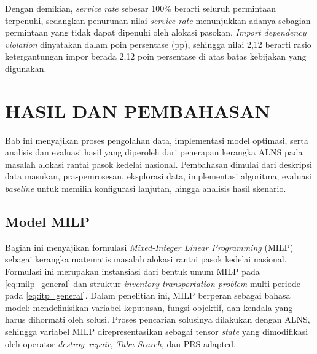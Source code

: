 \documentclass{file/TA-ITS}
\theoremstyle{definition}
\theoremstyle{definition}
\theoremstyle{plain}
\begin{document}
Dengan demikian, \textit{service rate} sebesar 100\% berarti seluruh permintaan terpenuhi, sedangkan penurunan nilai \textit{service rate} menunjukkan adanya sebagian permintaan yang tidak dapat dipenuhi oleh alokasi pasokan. \textit{Import dependency violation} dinyatakan dalam poin persentase (pp), sehingga nilai 2,12 berarti rasio ketergantungan impor berada 2,12 poin persentase di atas batas kebijakan yang digunakan.

\chapter{HASIL DAN PEMBAHASAN}

Bab ini menyajikan proses pengolahan data, implementasi model optimasi, serta analisis dan evaluasi hasil yang diperoleh dari penerapan kerangka ALNS pada masalah alokasi rantai pasok kedelai nasional. Pembahasan dimulai dari deskripsi data masukan, pra-pemrosesan, eksplorasi data, implementasi algoritma, evaluasi \textit{baseline} untuk memilih konfigurasi lanjutan, hingga analisis hasil skenario.

\section{Model MILP}

Bagian ini menyajikan formulasi \textit{Mixed-Integer Linear Programming} (MILP) sebagai kerangka matematis masalah alokasi rantai pasok kedelai nasional. Formulasi ini merupakan instansiasi dari bentuk umum MILP pada \ref{eq:milp_general} dan struktur \textit{inventory-transportation problem} multi-periode pada \ref{eq:itp_general}. Dalam penelitian ini, MILP berperan sebagai bahasa model: mendefinisikan variabel keputusan, fungsi objektif, dan kendala yang harus dihormati oleh solusi. Proses pencarian solusinya dilakukan dengan ALNS, sehingga variabel MILP direpresentasikan sebagai tensor \textit{state} yang dimodifikasi oleh operator \textit{destroy--repair}, \textit{Tabu Search}, dan PRS adapted.
\end{document}
